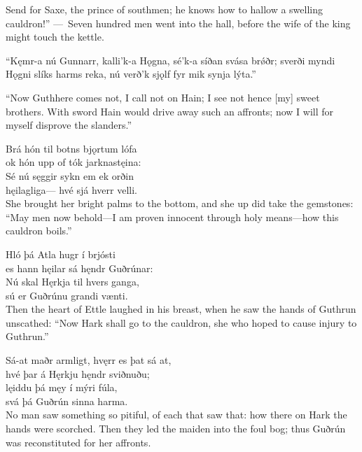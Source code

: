 \bvb Send for Saxe, the prince of southmen; he knows how to hallow a swelling cauldron!” — Seven hundred men went into the hall, before the wife of the king might touch the kettle.

\bva “Kęmr-a nú Gunnarr, \hld kalli’k-a Hǫgna,
sé’k-a síðan \hld svása brǿðr;
sverði myndi Hǫgni \hld slíks harms reka,
nú verð’k sjǫlf fyr mik \hld synja lýta.”

\bvb “Now Guthhere comes not, I call not on Hain; I see not hence [my] sweet brothers. With sword Hain would drive away such an affronts; now I will for myself disprove the slanders.”

\bva Brá hón til botns \hld bjǫrtum lófa \\%
ok hón upp of tók \hld jarknastęina: \\%
Sé nú sęggir \hld sykn em ek orðin \\%
hęilagliga— \hld hvé sjá hverr velli.\\%

\bvb She brought her bright palms to the bottom, and she up did take the gemstones: “May men now behold—I am proven innocent through holy means—how this cauldron boils.”

\bva Hló þá Atla \hld hugr í brjósti \\%
es hann hęilar sá \hld hęndr Guðrúnar: \\%
Nú skal Hęrkja \hld til hvers ganga, \\%
sú er Guðrúnu \hld grandi vænti. \\%

\bvb Then the heart of Ettle laughed in his breast, when he saw the hands of Guthrun unscathed: “Now Hark shall go to the cauldron, she who hoped to cause injury to Guthrun.”

\bva Sá-at maðr armligt, \hld hvęrr es þat sá at, \\%
hvé þar á Hęrkju \hld hęndr sviðnuðu; \\%
lęiddu þá męy \hld í mýri fúla, \\%
svá þá Guðrún \hld sinna harma.\\%

\bvb No man saw something so pitiful, of each that saw that: how there on Hark the hands were scorched. Then they led the maiden into the foul bog; thus Guðrún was reconstituted for her affronts.
